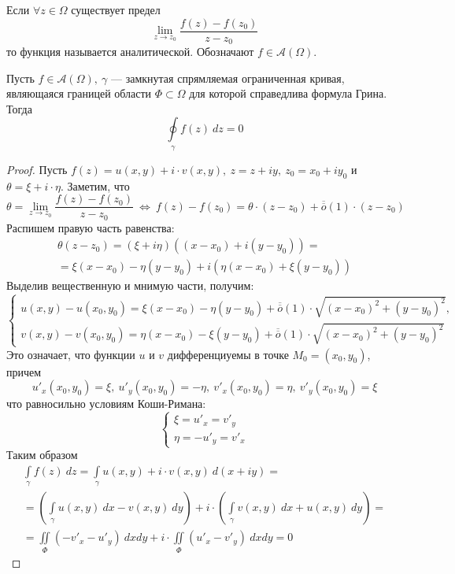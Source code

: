 \begin{definition}
    Если $\forall z\in \Omega$ существует предел
    \[\lim\limits_{z\to z_0}\frac{f(z)-f(z_0)}{z-z_0}\]
    то функция называется аналитической. Обозначают $f\in \mathcal{A}(\Omega)$.
\end{definition}
\begin{theorem}
    Пусть $f\in \mathcal{A}(\Omega),\ \gamma$ --- замкнутая спрямляемая ограниченная кривая, являющаяся границей области $\Phi\subset \Omega$ для которой справедлива формула Грина. Тогда
    \[\oint\limits_{\gamma}f(z)\ dz=0\] 
\end{theorem}
\begin{proof} Пусть $f(z)=u(x,y)+i\cdot v(x,y),\ z=z+iy,\ z_0=x_0+iy_0$ и $\theta=\xi+i\cdot \eta$. Заметим, что
    \[\theta=\lim\limits_{z\to z_0}\frac{f(z)-f(z_0)}{z-z_0}\ \Leftrightarrow\ f(z)-f(z_0)=\theta\cdot (z-z_0)+\overline{\overline{o}}(1)\cdot (z-z_0)\]
    Распишем правую часть равенства:
    \begin{multline*}
        \theta(z-z_0)=(\xi+i\eta)((x-x_0)+i(y-y_0))=\\
        =\xi(x-x_0)-\eta(y-y_0)+i(\eta(x-x_0)+\xi(y-y_0))
    \end{multline*}
    Выделив вещественную и мнимую части, получим:
    \[\begin{cases}
        u(x,y)-u(x_0,y_0)=\xi(x-x_0)-\eta(y-y_0)+\overline{\overline{o}}(1)\cdot \sqrt{(x-x_0)^2+(y-y_0)^2},\\
        v(x,y)-v(x_0,y_0)=\eta(x-x_0)-\xi(y-y_0)+\overline{\overline{o}}(1)\cdot \sqrt{(x-x_0)^2+(y-y_0)^2}
    \end{cases}\]
    Это означает, что функции $u$ и $v$ дифференциуемы в точке $M_0=(x_0,y_0)$, причем
    \[u'_x(x_0,y_0)=\xi,\ u'_y(x_0,y_0)=-\eta,\ v'_x(x_0,y_0)=\eta,\ v'_y(x_0,y_0)=\xi\] 
    что равносильно условиям Коши-Римана:
    \[\begin{cases}
        \xi=u'_x=v'_y\\
        \eta=-u'_y=v'_x
    \end{cases}\]
    Таким образом
    \begin{multline*}
        \int\limits_{\gamma}f(z)\ dz=\int\limits_{\gamma}u(x,y)+i\cdot v(x,y)\ d(x+iy)=\\
        =\left(\int\limits_{\gamma}u(x,y)\ dx-v(x,y)\ dy\right)+i\cdot \left(\int\limits_{\gamma}v(x,y)\ dx+u(x,y)\ dy\right)=\\
        =\iint\limits_{\Phi}(-v'_x-u'_y)\ dxdy+i\cdot \iint\limits_{\Phi}(u'_x-v'_y)\ dxdy=0
    \end{multline*}
\end{proof}
\newpage